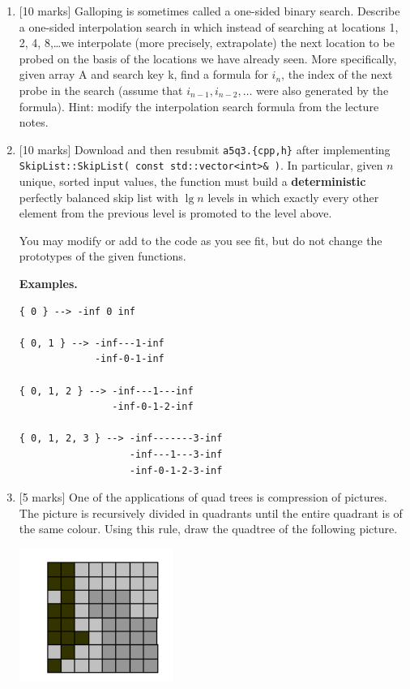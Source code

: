 \documentclass[11pt]{article}
\begin{document}
\begin{enumerate}
\item {[10 marks]}  
Galloping is sometimes called a one-sided binary search.
Describe a one-sided interpolation search in which instead of searching at locations 1, 2, 4, 8,\ldots we interpolate (more precisely, extrapolate) the next location to be probed on the basis of the locations we have already seen.
More specifically, given array A and search key k, find a formula for $i_n$, the index of the next probe in the search (assume that $i_{n-1}, i_{n-2}, \ldots$ were also generated by the formula).
Hint: modify the interpolation search formula from the lecture notes.

\item {[10 marks]}  
Download and then resubmit {\tt a5q3.\{cpp,h\}} after implementing {\tt SkipList::SkipList( const std::vector<int>\& )}. 
In particular, given $n$ unique, sorted input values, the function must build a {\bf deterministic} perfectly balanced skip list with $\lg n$ levels in which exactly every other element from the previous level is promoted to the level above.

You may modify or add to the code as you see fit, but do not change the prototypes of the given functions.

{\bf Examples.}
\begin{verbatim}
{ 0 } --> -inf 0 inf

{ 0, 1 } --> -inf---1-inf
             -inf-0-1-inf

{ 0, 1, 2 } --> -inf---1---inf
                -inf-0-1-2-inf

{ 0, 1, 2, 3 } --> -inf-------3-inf
                   -inf---1---3-inf
                   -inf-0-1-2-3-inf
\end{verbatim}

\item 	{[5 marks]}
One of the applications of quad trees is compression of pictures. The picture is recursively divided in quadrants until the entire quadrant is of the same colour. Using this rule, draw the quadtree of the following picture.

\includegraphics[width=50mm]{image.png} 


\end{enumerate}
\end{document}
